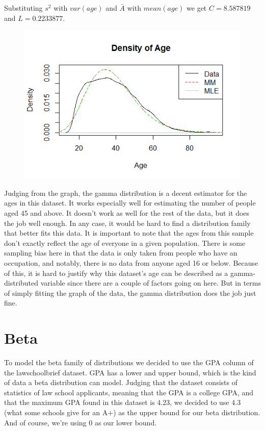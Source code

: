 \documentclass[12pt, a4paper, oneside]{report}
\begin{document}
Substituting $s^2$ with $var(age)$ and $\bar{A}$ with $mean(age)$ we get $C = 8.587819$ and $L = 0.2233877$.

\begin{figure}[h]
  \centering
  \includegraphics[width=0.7\linewidth]{gammaDensityA.png}
\end{figure}

Judging from the graph, the gamma distribution is a decent estimator for the ages in this dataset. It works especially well for estimating the number of people aged 45 and above. It doesn’t work as well for the rest of the data, but it does the job well enough. In any case, it would be hard to find a distribution family that better fits this data. 
It is important to note that the ages from this sample don’t exactly reflect the age of everyone in a given population. There is some sampling bias here in that the data is only taken from people who have an occupation, and notably, there is no data from anyone aged 16 or below. Because of this, it is hard to justify why this dataset’s age can be described as a gamma-distributed variable since there are a couple of factors going on here.
But in terms of simply fitting the graph of the data, the gamma distribution does the job just fine.


















\newpage
\section*{Beta}
To model the beta family of distributions we decided to use the GPA column of the lawschoolbrief dataset. GPA has a lower and upper bound, which is the kind of data a beta distribution can model. Judging that the dataset consists of statistics of law school applicants, meaning that the GPA is a college GPA, and that the maximum GPA found in this dataset is 4.23, we decided to use 4.3 (what some schools give for an A+) as the upper bound for our beta distribution. And of course, we’re using 0 as our lower bound. 
\end{document}
